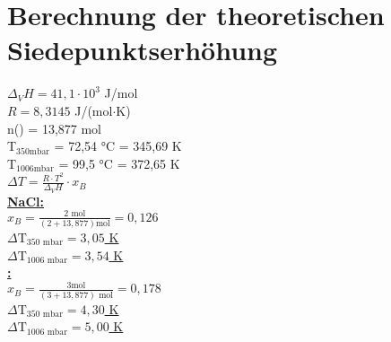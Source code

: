 \section*{Berechnung der theoretischen Siedepunktserhöhung}
	$\Delta _V H = 41,1 \cdot 10^3$ J/mol \\
	$R = 8,3145$ J/(mol$\cdot$K) \\
	\newline
	n() = 13,877 mol \\
	T$_{350\text{mbar}}$ = 72,54 °C = 345,69 K \\
	T$_{1006\text{mbar}}$ = 99,5 °C = 372,65 K \\
	\newline
	$\Delta T = \frac{R \cdot T^2}{\Delta _{V}H} \cdot x_{B}$ \\
	\newline
	\newline
	\underline{\textbf{NaCl:}} \\
	\newline
	$x_B = \frac{2 \textrm{ mol}}{(2 + 13,877)\textrm{mol}} = 0,126$\\
	\newline
	\underline{\underline{$\Delta \text{T}_{350 \text{ mbar}} = 3,05$ K}} \\ 
	\newline
	\underline{\underline{$\Delta \text{T}_{1006 \text{ mbar}} = 3,54$ K}} \\
	\newline
	\newline
	\underline{\textbf{:}} \\
	\newline
	$x_B = \frac{3 \textrm{mol}}{(3 + 13,877)\textrm{ mol}} = 0,178$\\
	\newline
	\underline{\underline{$\Delta \text{T}_{350 \text{ mbar}} = 4,30$ K}} \\ 
	\newline
	\underline{\underline{$\Delta \text{T}_{1006 \text{ mbar}} = 5,00$ K}} \\	

